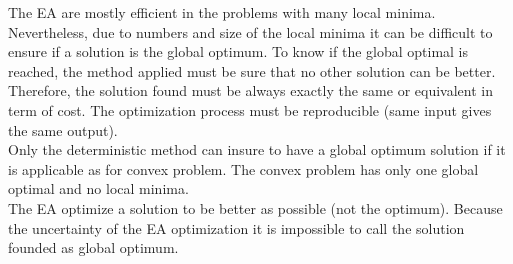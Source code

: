 The EA are mostly efficient in the problems with many local minima. Nevertheless, due to numbers and size of the local minima it can be difficult to ensure if a solution is the global optimum. 
To know if the global optimal is reached, the method applied must be sure that no other solution can be better. Therefore, the solution found must be always exactly the same or equivalent in term of cost. The optimization process must be reproducible (same input gives the same output).\\
 Only the deterministic method can insure to have a global optimum solution  if it is applicable as for convex problem. The convex problem has only one global optimal and no local minima. \\%
  The EA optimize a solution to be better as possible (not the optimum). Because the uncertainty of the EA optimization it is impossible to call the solution founded as global optimum.
 
